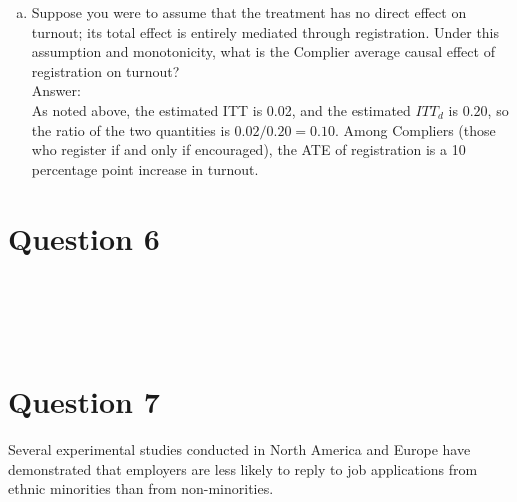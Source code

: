 \documentclass[11pt,notitlepage]{article}\usepackage[]{graphicx}\usepackage[]{color}
\makeatletter
\newenvironment{kframe}{%
 \def\at@end@of@kframe{}%
 \ifinner\ifhmode%
  \def\at@end@of@kframe{\end{minipage}}%
  \begin{minipage}{\columnwidth}%
 \fi\fi%
 \def\FrameCommand##1{\hskip\@totalleftmargin \hskip-\fboxsep
 \colorbox{shadecolor}{##1}\hskip-\fboxsep
     \hskip-\linewidth \hskip-\@totalleftmargin \hskip\columnwidth}%
 \MakeFramed {\advance\hsize-\width
   \@totalleftmargin\z@ \linewidth\hsize
   \@setminipage}}%
 {\par\unskip\endMakeFramed%
 \at@end@of@kframe}
\newenvironment{knitrout}{}{} %
\makeatother
\begin{document}
\begin{enumerate}[a)]
\item Suppose you were to assume that the treatment has no direct effect on turnout; its total effect is entirely mediated through registration. Under this assumption and monotonicity, what is the Complier average causal effect of registration on turnout?\\
Answer:\\
As noted above, the estimated ITT is 0.02, and the estimated $ITT_d$ is $0.20$, so the ratio of the two quantities is $0.02/0.20 = 0.10$.  Among Compliers (those who register if and only if encouraged), the ATE of registration is a 10 percentage point increase in turnout.


\end{enumerate}

\section*{Question 6}
\begin{knitrout}
\color{fgcolor}\begin{kframe}
\begin{verbatim}





\end{verbatim}
\end{kframe}
\end{knitrout}

\section*{Question 7}
Several experimental studies conducted in North America and Europe have demonstrated that employers are less likely to reply to job applications from ethnic minorities than from non-minorities.
\end{document}
